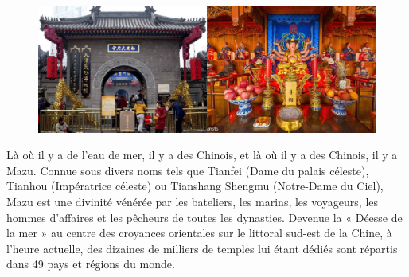 \begin{Ex}
        \begin{figure}[!h]
        \centering
                \includegraphics[width=1\textwidth]{ConfucianismeTaoismeBouddhismeChinois/Images/TempleDeesseMaritimeTianjin.png}

        

        \label{fig:enter-label}
    \end{figure}
Là où il y a de l'eau de mer, il y a des Chinois, et là où il y a des Chinois, il y a Mazu.
Connue sous divers noms tels que Tianfei (Dame du palais céleste), Tianhou (Impératrice céleste) ou Tianshang Shengmu (Notre-Dame du Ciel), Mazu est une divinité vénérée par les bateliers, les marins, les voyageurs, les hommes d'affaires et les pêcheurs de toutes les dynasties. Devenue la « Déesse de la mer » au centre des croyances orientales sur le littoral sud-est de la Chine, à l'heure actuelle, des dizaines de milliers de temples lui étant dédiés sont répartis dans 49 pays et régions du monde.
\end{Ex}
